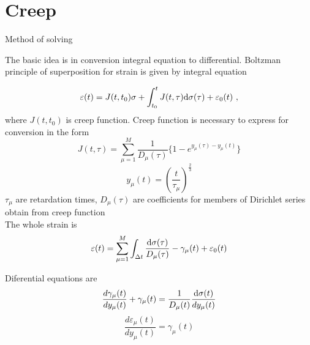 \section{Creep}

Method of solving

The basic idea is in conversion integral equation to differential. Boltzman principle  of superposition
for strain is given by integral equation

\begin{equation}
\varepsilon(t) = J(t,t_0)\sigma + \int_{t_0}^{t} {J(t,\tau) {\rm d}\sigma(\tau)} + \varepsilon_0(t)\ ,
\end{equation}
where $J(t,t_0)$ is creep  function.
Creep function is necessary to express for conversion in the form
\begin{equation}
J(t,\tau) = \sum_{\mu=1}^{M} \frac{1}{D_\mu(\tau)} \{{1-e^{y_\mu(\tau)-y_{\mu}(t)}}\} 
\end{equation}
\begin{equation}
y_{\mu}(t) = \left({\frac{t}{\tau_\mu}}\right)^{\frac{2}{3}}
\end{equation}
$\tau_\mu$ are retardation  times,
$D_\mu(\tau)$ are coefficients for members of Dirichlet series  obtain from creep function
\\
The whole strain is
\begin{equation}
\varepsilon(t) = \sum_{\mu=1}^{M}  \int_{\Delta t} \frac{{\rm d}\sigma(\tau)}{D_\mu(\tau)}- \gamma_{\mu}(t) + \varepsilon_0(t) 
\end{equation}

Diferential equations are
\begin{equation}
\frac{d\gamma_\mu(t)}{dy_\mu(t)} + \gamma_{\mu}(t) =  \frac{1}{D_{\mu}(t)} \frac{{\rm d}\sigma(t)}{dy_{\mu}(t)} 
\end{equation}
\begin{equation}
\frac{d\varepsilon_\mu(t)}{dy_\mu(t)}=\gamma_\mu(t) 
\end{equation}


